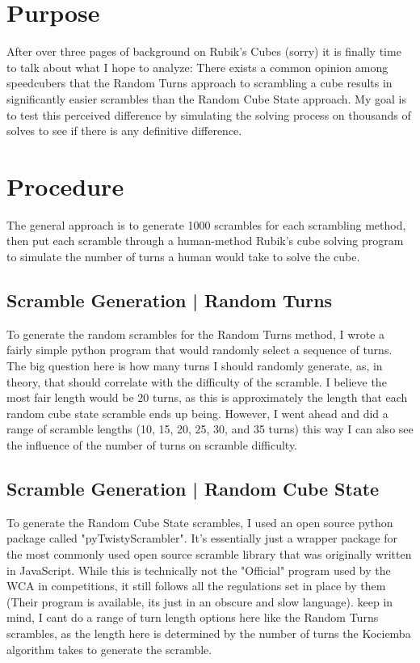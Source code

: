 \documentclass[12pt,letterpaper]{article}
\numberwithin{equation}{section}
\begin{document}
\section{Purpose}
After over three pages of background on Rubik's Cubes (sorry) it is finally time to talk about what I hope to analyze: There exists a common opinion among speedcubers that the Random Turns approach to scrambling a cube results in significantly easier scrambles than the Random Cube State approach. My goal is to test this perceived difference by simulating the solving process on thousands of solves to see if there is any definitive difference. 

\newpage

\section{Procedure}
The general approach is to generate 1000 scrambles for each scrambling method, then put each scramble through a human-method Rubik's cube solving program to simulate the number of turns a human would take to solve the cube. 
\subsection{Scramble Generation | Random Turns}
To generate the random scrambles for the Random Turns method, I wrote a fairly simple python program that would randomly select a sequence of turns. The big question here is how many turns I should randomly generate, as, in theory, that should correlate with the difficulty of the scramble. I believe the most fair length would be 20 turns, as this is approximately the length that each random cube state scramble ends up being. However, I went ahead and did a range of scramble lengths (10, 15, 20, 25, 30, and 35 turns) this way I can also see the influence of the number of turns on scramble difficulty. 

\subsection{Scramble Generation | Random Cube State}
To generate the Random Cube State scrambles, I used an open source python package called "pyTwistyScrambler". It's essentially just a wrapper package for the most commonly used open source scramble library that was originally written in JavaScript. While this is technically not the "Official" program used by the WCA in competitions, it still follows all the regulations set in place by them (Their program is available, its just in an obscure and slow language). keep in mind, I cant do a range of turn length options here like the Random Turns scrambles, as the length here is determined by the number of turns the Kociemba algorithm takes to generate the scramble.  
\end{document}
